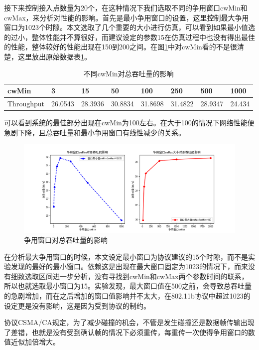 \documentclass{article}
\begin{document}
接下来控制接入点数量为20个，在这种情况下我们选取不同的争用窗口cwMin和cwMax，来分析对性能的影响。首先是最小争用窗口的设置，这里控制最大争用窗口为1023个时隙。本文选取了几个重要的大小进行仿真，可以看到如果最小值选的过小，整体性能并不算很好，而建议设定的参数15在仿真过程中也没有得出最佳的性能，整体较好的性能出现在150到200之间。在图\ref{fig:cwMin_Max}中对cwMin看的不是很清楚，这里放出原始数据表\ref{tab:cwMin}。

\begin{table}[]
	\centering
	\begin{tabular}{llllllll}
		\hline
		cwMin      & 3       & 15      & 50      & 100     & 250     & 500     & 1000   \\
		\hline
		Throughput & 26.0543 & 28.3936 & 30.8834 & 31.8698 & 31.4822 & 28.9347 & 24.434 \\
		\hline
	\end{tabular}
	\caption{不同cwMin对总吞吐量的影响}
	\label{tab:cwMin}
\end{table}

可以看到系统的最佳部分出现在cwMin为100左右。在大于100的情况下网络性能便急剧下降，且总吞吐量和最小争用窗口有线性减少的关系。

\begin{figure}[ht]
	\centering
	\includegraphics[scale=0.6]{picture/cwMin_Max.png}
	\caption{争用窗口对总吞吐量的影响}
	\label{fig:cwMin_Max}
\end{figure}

在分析最大争用窗口的时候，本文设定最小窗口为协议建议的15个时隙，而不是实验发现的最好的最小窗口。依赖这是出现在最大窗口固定为1023的情况下，而来没有细致选取区间进一步分析，没有寻找到cwMin和cwMax两个参数时间的联系，所以也就选取最小窗口为15。实验发现，最大窗口值在500之前，会导致总吞吐量的急剧增加，而在之后增加的窗口值影响并不太大，在802.11b协议中超过1023的设定更是没有影响，这是因为受到协议的制约。

协议CSMA/CA规定，为了减少碰撞的机会，不管是发生碰撞还是数据帧传输出现了差错，也就是没有受到确认帧的情况下必须重传，每重传一次使得争用窗口的数值近似加倍增大。
\end{document}
